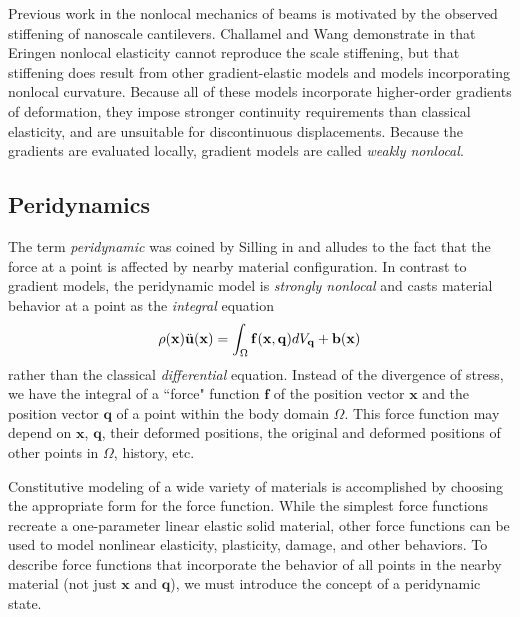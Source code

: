 \documentclass[5p,twocolumn]{elsarticle}
\newcommand{\mathbi}[1]{\mathit{\mathbf{#1}}}
\begin{document}
Previous work in the nonlocal mechanics of beams is motivated by the observed stiffening of nanoscale cantilevers.
Challamel and Wang demonstrate in \cite{Challamel2008small} that Eringen nonlocal elasticity cannot reproduce the scale stiffening, but that stiffening does result from other gradient-elastic models and models incorporating nonlocal curvature.
Because all of these models incorporate higher-order gradients of deformation, they impose stronger continuity requirements than classical elasticity, and are unsuitable for discontinuous displacements.
Because the gradients are evaluated locally, gradient models are called \textit{weakly nonlocal}.

%
\subsection{Peridynamics}
\label{sec:PDintro}
The term \textit{peridynamic} was coined by Silling in \cite{silling2000reformulation} and alludes to the fact that the force at a point is affected by nearby material configuration.
In contrast to gradient models, the peridynamic model is \textit{strongly nonlocal} and casts material behavior at a point as the \textit{integral} equation 
%
\begin{equation}
\label{eq:PDCoPV}
\rho(\mathbf{x})\ddot{\mathbf{u}}(\mathbf{x}) = \int_\Omega \mathbi{f}(\mathbf{x},\mathbf{q}) dV_\mathbf{q}  + \mathbf{b}(\mathbf{x}) \notag
\end{equation}
%
rather than the classical \textit{differential} equation.
Instead of the divergence of stress, we have the integral of a ``force" function $\mathbi{f}$ of the position vector $\mathbf{x}$ and the position vector $\mathbf{q}$ of a point within the body domain $\Omega$. 
This force function may depend on \(\mathbf{x}\), \(\mathbf{q}\), their deformed positions, the original and deformed positions of other points in \(\Omega\), history, etc.

Constitutive modeling of a wide variety of materials is accomplished by choosing the appropriate form for the force function.
While the simplest force functions recreate a one-parameter linear elastic solid material\cite{silling2000reformulation}, other force functions can be used to model nonlinear elasticity, plasticity, damage, and other behaviors\cite{silling2005peridynamic}.
To describe force functions that incorporate the behavior of all points in the nearby material (not just \(\mathbf{x}\) and \(\mathbf{q}\)), we must introduce the concept of a peridynamic state.
\end{document}
